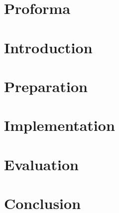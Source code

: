 \documentclass[12pt,notitlepage,a4paper]{report}
\begin{document}
\medskip
{}
\clearpage

\chapter*{Proforma}

\newpage

\cleardoublepage

\tableofcontents
\listoffigures
\listoflistings


\cleardoublepage        %

\setcounter{page}{1}
\pagestyle{headings}



\chapter{Introduction}

\cleardoublepage

\chapter{Preparation}

\cleardoublepage

\chapter{Implementation}

\cleardoublepage

\chapter{Evaluation}

\cleardoublepage

\chapter{Conclusion}

\cleardoublepage


\cleardoublepage

\appendix
\end{document}
